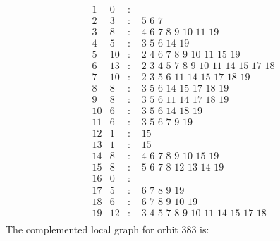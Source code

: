 \documentclass[12pt]{article}
\begin{document}
\begin{equation*}
\begin{array}{rrcl}
1&0&:&\\
2&3&:&\,\,5\,\,6\,\,7\\
3&8&:&\,\,4\,\,6\,\,7\,\,8\,\,9\,\,10\,\,11\,\,19\\
4&5&:&\,\,3\,\,5\,\,6\,\,14\,\,19\\
5&10&:&\,\,2\,\,4\,\,6\,\,7\,\,8\,\,9\,\,10\,\,11\,\,15\,\,19\\
6&13&:&\,\,2\,\,3\,\,4\,\,5\,\,7\,\,8\,\,9\,\,10\,\,11\,\,14\,\,15\,\,17\,\,18\\
7&10&:&\,\,2\,\,3\,\,5\,\,6\,\,11\,\,14\,\,15\,\,17\,\,18\,\,19\\
8&8&:&\,\,3\,\,5\,\,6\,\,14\,\,15\,\,17\,\,18\,\,19\\
9&8&:&\,\,3\,\,5\,\,6\,\,11\,\,14\,\,17\,\,18\,\,19\\
10&6&:&\,\,3\,\,5\,\,6\,\,14\,\,18\,\,19\\
11&6&:&\,\,3\,\,5\,\,6\,\,7\,\,9\,\,19\\
12&1&:&\,\,15\\
13&1&:&\,\,15\\
14&8&:&\,\,4\,\,6\,\,7\,\,8\,\,9\,\,10\,\,15\,\,19\\
15&8&:&\,\,5\,\,6\,\,7\,\,8\,\,12\,\,13\,\,14\,\,19\\
16&0&:&\\
17&5&:&\,\,6\,\,7\,\,8\,\,9\,\,19\\
18&6&:&\,\,6\,\,7\,\,8\,\,9\,\,10\,\,19\\
19&12&:&\,\,3\,\,4\,\,5\,\,7\,\,8\,\,9\,\,10\,\,11\,\,14\,\,15\,\,17\,\,18\\
\end{array}
\end{equation*}
The complemented local graph for orbit $383$ is:
\end{document}
